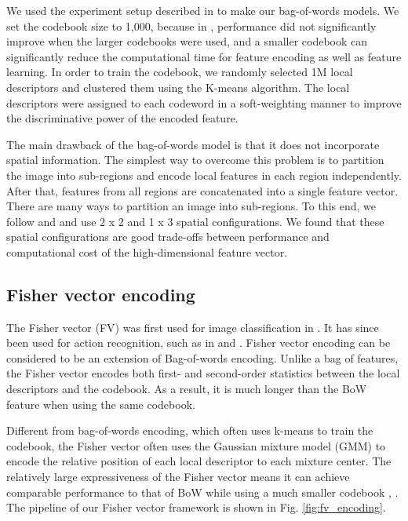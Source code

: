 We used the experiment setup described in \cite{jiang2010representations} to make our bag-of-words models. We set the codebook size to 1,000, because in \cite{jiang2010representations}, performance did not significantly improve when the larger codebooks were used, and a smaller codebook can significantly reduce the computational time for feature encoding as well as feature learning. In order to train the codebook, we randomly selected 1M local descriptors and clustered them using the K-means algorithm. The local descriptors were assigned to each codeword in a soft-weighting manner \cite{jiang2007towards} to improve the discriminative power of the encoded feature.

The main drawback of the bag-of-words model is that it does not incorporate spatial information. The simplest way to overcome this problem is to partition the image into sub-regions and encode local features in each region independently. After that, features from all regions are concatenated into a single feature vector. There are many ways to partition an image into sub-regions. To this end, we follow \cite{jiang2010representations} and \cite{lazebnik2006beyond} and use 2 x 2 and 1 x 3 spatial configurations. We found that these spatial configurations are good trade-offs between performance and computational cost of the high-dimensional feature vector.

\subsection{Fisher vector encoding}
The Fisher vector (FV) was first used for image classification in \cite{jaakkola1999exploiting}. It has since been used for action recognition, such as in \cite{sun2013large} and \cite{wang2013action}. Fisher vector encoding can be considered to be an extension of Bag-of-words encoding. Unlike a bag of features, the Fisher vector encodes both first- and second-order statistics between the local descriptors and the codebook. As a result, it is much longer than the BoW feature when using the same codebook. 

Different from bag-of-words encoding, which often uses k-means to train the codebook, the Fisher vector often uses the Gaussian mixture model (GMM) to encode the relative position of each local descriptor to each mixture center. The relatively large expressiveness of the Fisher vector means it can achieve comparable performance to that of BoW while using a much smaller codebook \cite{sanchez2013image}, \cite{sun2013large}. The pipeline of our Fisher vector framework is shown in Fig. \ref{fig:fv_encoding}.

